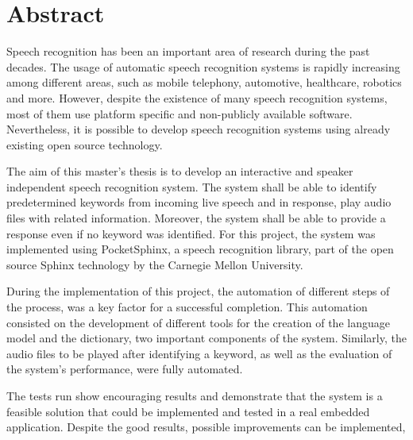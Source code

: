 \chapter*{Abstract}
\thispagestyle{empty} %
Speech recognition has been an important area of research during the past
decades.  The usage of automatic speech recognition systems is rapidly
increasing among different areas, such as mobile telephony, automotive,
healthcare, robotics and more. However, despite the existence of many speech
recognition systems, most of them use platform specific and non-publicly
available software. Nevertheless, it is possible to develop speech recognition
systems using already existing open source technology.

The aim of this master’s thesis is to develop an interactive and speaker
independent speech recognition system. The system shall be able to identify
predetermined keywords from incoming live speech and in response, play audio
files with related information.  Moreover, the system shall be able to provide
a response even if no keyword was identified. For this project, the system was
implemented using PocketSphinx, a speech recognition library, part of the open
source Sphinx technology by the Carnegie Mellon University.

During the implementation of this project, the automation of different steps of
the process, was a key factor for a successful completion. This automation
consisted on the development of different tools for the creation of the
language model and the dictionary, two important components of the system.
Similarly, the audio files to be played after identifying a keyword, as well as
the evaluation of the system’s performance, were fully automated.

The tests run show encouraging results and demonstrate that the system is a
feasible solution that could be implemented and tested in a real embedded
application. Despite the good results, possible improvements can be
implemented,


